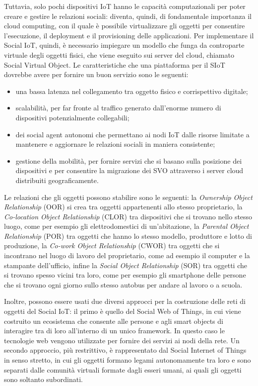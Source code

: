 Tuttavia, solo pochi dispositivi IoT hanno le capacità computazionali per poter creare e gestire le relazioni sociali: diventa, quindi, di fondamentale importanza il cloud computing, con il quale è possibile virtualizzare gli oggetti per consentire l'esecuzione, il deployment e il provisioning delle applicazioni. Per implementare il Social IoT, quindi, è necessario impiegare un modello che funga da controparte virtuale degli oggetti fisici, che viene eseguito sui server del cloud, chiamato Social Virtual Object. Le caratteristiche che una piattaforma per il SIoT dovrebbe avere per fornire un buon servizio sono le seguenti:
\begin{itemize}
\item una bassa latenza nel collegamento tra oggetto fisico e corrispettivo digitale;
\item scalabilità, per far fronte al traffico generato dall'enorme numero di dispositivi potenzialmente collegabili;
\item dei social agent autonomi che permettano ai nodi IoT dalle risorse limitate a mantenere e aggiornare le relazioni sociali in maniera consistente;
\item gestione della mobilità, per fornire servizi che si basano sulla posizione dei dispositivi e per consentire la migrazione dei SVO attraverso i server cloud distribuiti geograficamente.
\end{itemize}

Le relazioni che gli oggetti possono stabilire sono le seguenti: la \textit{Ownership Object Relationship} (OOR) si crea tra oggetti appartenenti allo stesso proprietario, la \textit{Co-location Object Relationship} (CLOR) tra dispositivi che si trovano nello stesso luogo, come per esempio gli elettrodomestici di un'abitazione, la \textit{Parental Object Relationship} (POR) tra oggetti che hanno lo stesso modello, produttore e lotto di produzione, la \textit{Co-work Object Relationship} (CWOR) tra oggetti che si incontrano nel luogo di lavoro del proprietario, come ad esempio il computer e la stampante dell'ufficio, infine la \textit{Social Object Relationship} (SOR) tra oggetti che si trovano spesso vicini tra loro, come per esempio gli smartphone delle persone che si trovano ogni giorno sullo stesso autobus per andare al lavoro o a scuola.

Inoltre, possono essere usati due diversi approcci per la costruzione delle reti di oggetti del Social IoT: il primo è quello del Social Web of Things, in cui viene costruito un ecosistema che consente alle persone e agli smart objects di interagire tra di loro all'interno di un unico framework. In questo caso le tecnologie web vengono utilizzate per fornire dei servizi ai nodi della rete. Un secondo approccio, più restrittivo, è rappresentato dal Social Internet of Things in senso stretto, in cui gli oggetti formano legami autonomamente tra loro e sono separati dalle comunità virtuali formate dagli esseri umani, ai quali gli oggetti sono soltanto subordinati.

